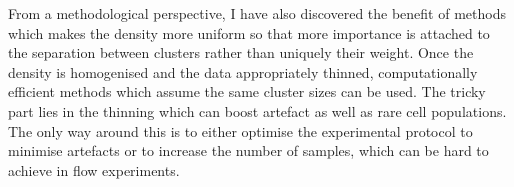 From a methodological perspective, I have also discovered the benefit of methods which makes the density more uniform so that more importance is attached to the separation between clusters rather than uniquely their weight.
Once the density is homogenised and the data appropriately thinned, computationally efficient methods which assume the same cluster sizes can be used.
The tricky part lies in the thinning which can boost artefact as well as rare cell populations.
The only way around this is to either optimise the experimental protocol to minimise artefacts or to increase the number of samples, which can be hard to achieve in flow experiments. %






